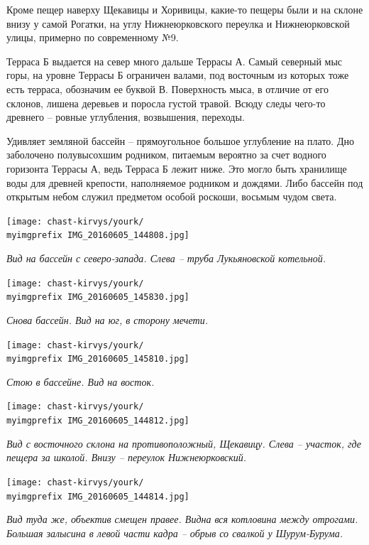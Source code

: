 Кроме пещер наверху Щекавицы и Хоривицы, какие-то пещеры были и на склоне внизу у самой Рогатки, на углу Нижнеюрковского переулка и Нижнеюрковской улицы, примерно по современному №9.

Терраса Б выдается на север много дальше Террасы А. Самый северный мыс горы, на уровне Террасы Б ограничен валами, под восточным из которых тоже есть терраса, обозначим ее буквой В. Поверхность мыса, в отличие от его склонов, лишена деревьев и поросла густой травой. Всюду следы чего-то древнего – ровные углубления, возвышения, переходы.

Удивляет земляной бассейн – прямоугольное большое углубление на плато. Дно заболочено полувысохшим родником, питаемым вероятно за счет водного горизонта Террасы А, ведь Терраса Б лежит ниже. Это могло быть хранилище воды для древней крепости, наполняемое родником и дождями. Либо бассейн под открытым небом служил предметом особой роскоши, восьмым чудом света. 

\begin{center}
\texttt{[image: chast-kirvys/yourk/\\myimgprefix IMG\_20160605\_144808.jpg]}

\textit{Вид на бассейн с северо-запада. Слева – труба Лукьяновской котельной.}
\end{center}

\begin{center}
\texttt{[image: chast-kirvys/yourk/\\myimgprefix IMG\_20160605\_145830.jpg]}

\textit{Снова бассейн. Вид на юг, в сторону мечети.}
\end{center}

\begin{center}
\texttt{[image: chast-kirvys/yourk/\\myimgprefix IMG\_20160605\_145810.jpg]}

\textit{Стою в бассейне. Вид на восток.}
\end{center}

\newpage

\begin{center}
\texttt{[image: chast-kirvys/yourk/\\myimgprefix IMG\_20160605\_144812.jpg]}

\textit{Вид с восточного склона на противоположный, Щекавицу. Слева – участок, где пещера за школой. Внизу – переулок Нижнеюрковский.}
\end{center}

\begin{center}
\texttt{[image: chast-kirvys/yourk/\\myimgprefix IMG\_20160605\_144814.jpg]}

\textit{Вид туда же, объектив смещен правее. Видна вся котловина между отрогами. Большая залысина в левой части кадра – обрыв со свалкой у Шурум-Бурума.}
\end{center}

